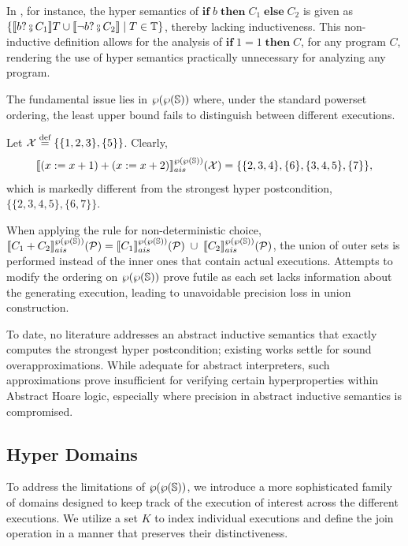 \documentclass[
  10pt,       %
  twoside,    %
  a4paper,    %
  english,    %
  tikz,       %
  openright,  %
]{book}
\begin{document}
In \cite{Mounir17}, for instance, the hyper semantics of $\bm{if} \; b \;
\bm{then} \; C_1 \; \bm{else} \; C_2$ is given as $\{ \sem{b ? \fcmp C_1} T
\cup \sem{\neg b ? \fcmp C_2} \mid T \in \mathbb{T}\}$, thereby lacking
inductiveness. This non-inductive definition allows for the analysis of
$\bm{if} \; 1 = 1 \; \bm{then} \; C$, for any program $C$, rendering the use of
hyper semantics practically unnecessary for analyzing any program.

The fundamental issue lies in $\pow{\pow{\states}}$ where, under the standard
powerset ordering, the least upper bound fails to distinguish between different
executions.

\begin{example}
  \label{exmp:determinism}
  Let $\mathcal{X} \defeq \{\{1, 2, 3\}, \{5\}\}$. Clearly,
  $$\asem[\pow{\pow{\states}}]{(x := x + 1) + (x := x + 2)}(\mathcal{X}) = 
  \{\{2, 3, 4\}, \{6\}, \{3, 4, 5\}, \{7\}\},$$
  which is markedly different from the strongest hyper postcondition, 
  $\{\{2, 3, 4, 5\}, \{6, 7\}\}$.
\end{example}

When applying the rule for non-deterministic choice,
$\asem[\pow{\pow{\states}}]{C_1 + C_2}(\mathcal{P}) =
\asem[\pow{\pow{\states}}]{C_1}(\mathcal{P}) \;\cup\;
\asem[\pow{\pow{\states}}]{C_2}(\mathcal{P})$, the union of outer sets is
performed instead of the inner ones that contain actual executions. Attempts to
modify the ordering on $\pow{\pow{\states}}$ prove futile as each set lacks
information about the generating execution, leading to unavoidable precision
loss in union construction.

To date, no literature addresses an abstract inductive semantics that exactly
computes the strongest hyper postcondition; existing works settle for sound
overapproximations. While adequate for abstract interpreters, such
approximations prove insufficient for verifying certain hyperproperties within
Abstract Hoare logic, especially where precision in abstract inductive
semantics is compromised.


\subsection{Hyper Domains}

To address the limitations of $\pow{\pow{\states}}$, we introduce a more
sophisticated family of domains designed to keep track of the execution of
interest across the different executions. We utilize a set $K$ to index
individual executions and define the join operation in a manner that preserves
their distinctiveness.
\end{document}
